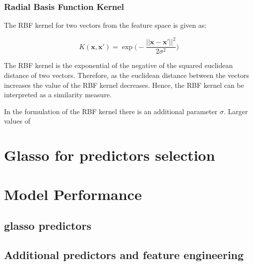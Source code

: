 \documentclass[11pt]{article}
\theoremstyle{definition}
\newcommand{\bx}{\mathbf{x}}
\begin{document}
\subsubsection{Radial Basis Function Kernel}

The RBF kernel for two vectors from the feature space is given as:

\begin{equation}
    K(\bx, \bx') = \exp{\Bigg(-\frac{||\bx - \bx'||^2}{2\sigma^2}\Bigg)}
\end{equation}

The RBF kernel is the exponential of the negative of the squared euclidean distance of two vectors. Therefore, as the euclidean distance between the vectors increases the value of the RBF kernel decreases. Hence, the RBF kernel can be interpreted as a similarity measure.

In the formulation of the RBF kernel there is an additional parameter $\sigma$. Larger values of 


\section{Glasso for predictors selection}

\section{Model Performance}

\subsection{glasso predictors}

\subsection{Additional predictors and feature engineering}

\newpage
\end{document}
